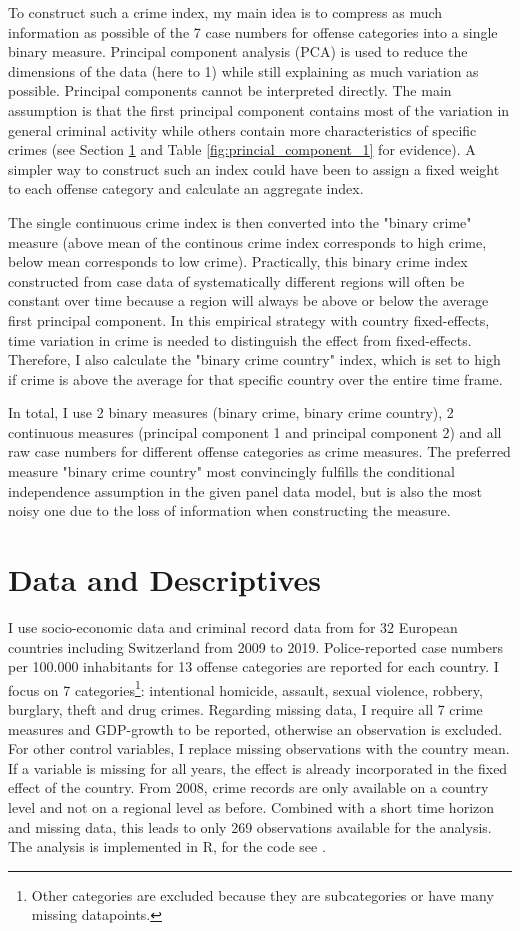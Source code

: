 \documentclass[a4paper,12pt]{article}
\begin{document}
To construct such a crime index, my main idea is to compress as much information as possible of the 7 case numbers for offense categories into a single binary measure. 
Principal component analysis (PCA) is used to reduce the dimensions of the data (here to 1) while still explaining as much variation as possible. Principal components cannot be interpreted directly. The main assumption is that the first principal component contains most of the variation in general criminal activity while others contain more characteristics of specific crimes (see Section \ref{Data} and Table \ref{fig:princial_component_1} for evidence).
A simpler way to construct such an index could have been to assign a fixed weight to each offense category and calculate an aggregate index. 

The single continuous crime index is then converted into the "binary crime" measure (above mean of the continous crime index corresponds to high crime, below mean corresponds to low crime). Practically, this binary crime index constructed from case data of systematically different regions will often be constant over time because a region will always be above or below the average first principal component. In this empirical strategy with country fixed-effects, time variation in crime is needed to distinguish the effect from fixed-effects. Therefore, I also calculate the "binary crime country" index, which is set to high if crime is above the average for that specific country over the entire time frame. 

In total, I use 2 binary measures (binary crime, binary crime country), 2 continuous measures (principal component 1 and principal component 2) and all raw case numbers for different offense categories as crime measures. The preferred measure "binary crime country" most convincingly fulfills the conditional independence assumption in the given panel data model, but is also the most noisy one due to the loss of information when constructing the measure.  

\section{Data and Descriptives}
\label{Data}
I use socio-economic data and criminal record data from \cite{eurostat} for 32 European countries including Switzerland from 2009 to 2019. 
Police-reported case numbers per 100.000 inhabitants for 13 offense categories are reported for each country. I focus on 7 categories\footnote{Other categories are excluded because they are subcategories or have many missing datapoints.}: intentional homicide, assault, sexual violence, robbery, burglary, theft and drug crimes. 
Regarding missing data, I require all 7 crime measures and GDP-growth to be reported, otherwise an observation is excluded. For other control variables, I replace missing observations with the country mean. If a variable is missing for all years, the effect is already incorporated in the fixed effect of the country.
From 2008, crime records are only available on a country level and not on a regional level as before. Combined with a short time horizon and missing data, this leads to only 269 observations available for the analysis. The analysis is implemented in R, for the code see \cite{github}.
\end{document}
